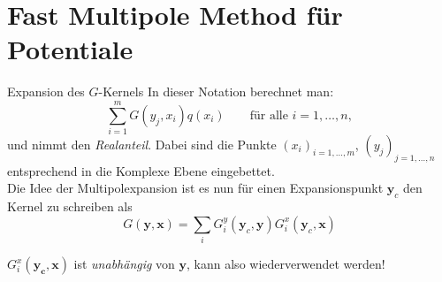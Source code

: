 \documentclass[ngerman]{beamer}
\begin{document}
\section{Fast Multipole Method für Potentiale}

\begin{frame}{Expansion des $G$-Kernels}
In dieser Notation berechnet man: 
\begin{equation}\label{potential}
\sum_{i=1}^m {G(y_j,x_i)q(x_i)} \qquad \text{für alle }i=1,\ldots,n, 
\end{equation}
und nimmt den \emph{Realanteil}. Dabei sind die Punkte $(x_i)_{i=1,\ldots,m}$, $(y_j)_{j=1,\ldots,n}$ entsprechend in die Komplexe Ebene eingebettet.\\
Die Idee der Multipolexpansion ist es nun für einen Expansionspunkt $\mathbf{y}_c$ den Kernel zu schreiben als 
\begin{equation}
\nonumber
G(\mathbf{y},\mathbf{x}) = \sum_i G_i^y(\mathbf{y}_c,\mathbf{y})G_i^x(\mathbf{y}_c,\mathbf{x})
\end{equation}
\begin{alertblock}

$G_i^x(\mathbf{y_c},\mathbf{x})$ ist \emph{unabhängig} von $\mathbf{y}$, kann also wiederverwendet werden!

\end{alertblock}
\end{frame}
\end{document}
